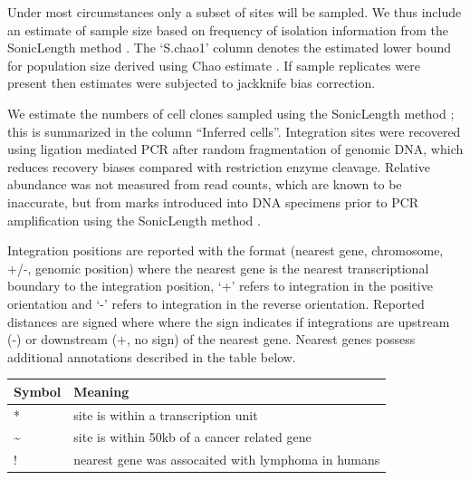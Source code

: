 \documentclass[]{article}
\begin{document}
Under most circumstances only a subset of sites will be sampled. We thus
include an estimate of sample size based on frequency of isolation
information from the SonicLength method \citet{berry2012}. The `S.chao1'
column denotes the estimated lower bound for population size derived
using Chao estimate \citet{chao1987}. If sample replicates were present
then estimates were subjected to jackknife bias correction.

We estimate the numbers of cell clones sampled using the SonicLength
method \citet{berry2012}; this is summarized in the column ``Inferred
cells''. Integration sites were recovered using ligation mediated PCR
after random fragmentation of genomic DNA, which reduces recovery biases
compared with restriction enzyme cleavage. Relative abundance was not
measured from read counts, which are known to be inaccurate, but from
marks introduced into DNA specimens prior to PCR amplification using the
SonicLength method \citet{berry2012}.

Integration positions are reported with the format (nearest gene,
chromosome, +/-, genomic position) where the nearest gene is the nearest
transcriptional boundary to the integration position, `+' refers to
integration in the positive orientation and `-' refers to integration in
the reverse orientation. Reported distances are signed where where the
sign indicates if integrations are upstream (-) or downstream (+, no
sign) of the nearest gene. Nearest genes possess additional annotations
described in the table below.

\begin{table}[ht]
\centering
\begin{tabular}{ll}
  \hline
Symbol & Meaning \\ 
  \hline
* & site is within a transcription unit \\ 
  \~{} & site is within 50kb of a cancer related gene \\ 
  ! & nearest gene was assocaited with lymphoma in humans \\ 
   \hline
\end{tabular}
\end{table}
\end{document}
